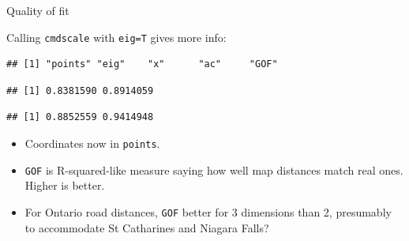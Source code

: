 \begin{frame}[fragile]{Quality of fit}
  
  Calling \texttt{cmdscale} with \texttt{eig=T} gives more info:

  {\footnotesize
\begin{knitrout}
\color{fgcolor}\begin{kframe}
\begin{alltt}
\hlkwb{=}
\end{alltt}
\begin{verbatim}
## [1] "points" "eig"    "x"      "ac"     "GOF"
\end{verbatim}
\begin{alltt}
\hlopt{$}
\end{alltt}
\begin{verbatim}
## [1] 0.8381590 0.8914059
\end{verbatim}
\begin{alltt}
\hlstd{,}\hlopt{$}
\end{alltt}
\begin{verbatim}
## [1] 0.8852559 0.9414948
\end{verbatim}
\end{kframe}
\end{knitrout}
}

\begin{itemize}
\item Coordinates now in \texttt{points}.
\item \texttt{GOF} is R-squared-like measure saying how well map
  distances match real ones. Higher is better.
\item For Ontario road distances, \texttt{GOF} better for 3 dimensions
  than 2, presumably to accommodate St Catharines and Niagara Falls?
\end{itemize}
  
\end{frame}


